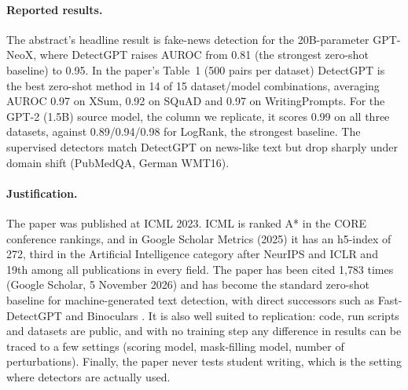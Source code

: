 \documentclass[11pt]{article}
\begin{document}
\paragraph{Reported results.} The abstract's headline result is fake-news detection for the 20B-parameter GPT-NeoX, where DetectGPT raises AUROC from 0.81 (the strongest zero-shot baseline) to 0.95. In the paper's Table~1 (500 pairs per dataset) DetectGPT is the best zero-shot method in 14 of 15 dataset/model combinations, averaging AUROC 0.97 on XSum, 0.92 on SQuAD and 0.97 on WritingPrompts. For the GPT-2 (1.5B) source model, the column we replicate, it scores 0.99 on all three datasets, against 0.89/0.94/0.98 for LogRank, the strongest baseline. The supervised detectors match DetectGPT on news-like text but drop sharply under domain shift (PubMedQA, German WMT16).

\paragraph{Justification.} The paper was published at ICML 2023. ICML is ranked A* in the CORE conference rankings, and in Google Scholar Metrics (2025) it has an h5-index of 272, third in the Artificial Intelligence category after NeurIPS and ICLR and 19th among all publications in every field. The paper has been cited 1{,}783 times (Google Scholar, 5 November 2026) and has become the standard zero-shot baseline for machine-generated text detection, with direct successors such as Fast-DetectGPT \citep{bao2024fast} and Binoculars \citep{hans2024binoculars}. It is also well suited to replication: code, run scripts and datasets are public, and with no training step any difference in results can be traced to a few settings (scoring model, mask-filling model, number of perturbations). Finally, the paper never tests student writing, which is the setting where detectors are actually used.

\end{document}
